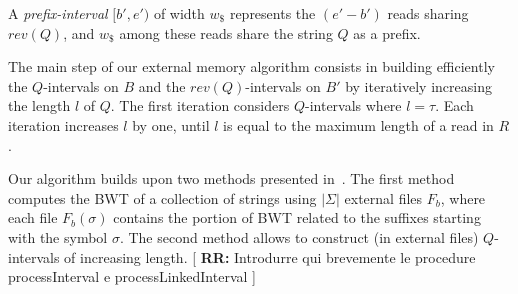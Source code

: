 \documentclass[runningheads,envcountsame,a4paper]{llncs}
\newcommand{\notaestesa}[2]{%
 \marginpar{\color{red!75!black}\textbf{\texttimes}}%
 {\color{red!75!black}%
 [\,\textbullet\,\textsf{\textbf{#1:}} %
 \textsf{\footnotesize#2}\,\textbullet\,]}%
}
\begin{document}
A \emph{prefix-interval} $[b',e')$ of width $w_{\$}$ represents the $(e'-b')$
reads sharing $rev(Q)$, and $w_{\$}$ among these reads share the string $Q$ as a
prefix.

The main step of our external memory algorithm consists in  building efficiently
the $Q$-intervals on $B$ and the $rev(Q)$-intervals on
$B'$ by iteratively increasing the length $l$ of $Q$.
The first iteration considers $Q$-intervals where $l=\tau$.
Each iteration increases $l$ by one, until $l$ is equal to the maximum length
of a read in $R$.

Our algorithm builds upon two methods presented in~\cite{Bauer2011,Cox2012}.
The first method computes the BWT of a collection of strings using $|\Sigma|$
external files $F_b$, where each file $F_b(\sigma)$ contains the portion of BWT related to the suffixes
starting with the symbol $\sigma$.
The second method allows to construct (in external files) $Q$-intervals
of increasing length. \notaestesa{RR}{Introdurre qui brevemente le procedure processInterval e processLinkedInterval}

\begin{comment}
In particular, the procedure \emph{processInterval} given
in~\cite{Cox2012} is used in our algorithm to produce the sorted list
(lexicographical order) of the intervals of a given length $l$, from the
sorted list of the intervals of length $l-1$ (intervals of length $1$
can be easily obtained by means of the FM-index function $C$).
\notaestesa{Raffa}{Togliere lo pseudocodice della procedura processInterval: \'e della Rosone e non nostro.}.
\notaestesa{GDV}{ Concordo di togliere lo pseudocodice.
Bisogna dire però cosa calcola la procedura}

We extend the procedure \emph{processInterval} to
\emph{processLinkedInterval}, where we produce not only the $Q$-intervals on $B$, but also the linked
$rev(Q)$-intervals on $B'$.
\end{comment}
\end{document}
